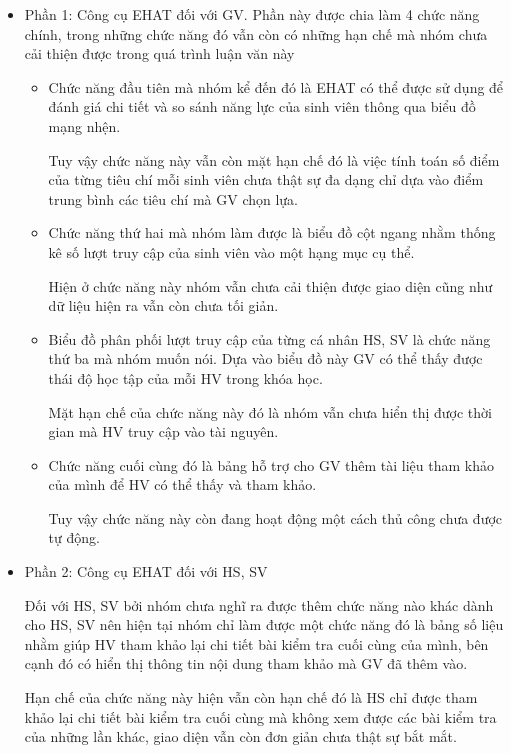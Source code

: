 \begin{itemize}
	\item Phần 1: Công cụ EHAT đối với GV.
	Phần này được chia làm 4 chức năng chính, trong những chức năng đó vẫn còn có những hạn chế mà nhóm chưa cải thiện được trong quá trình luận văn này
	\begin{itemize}
		\item Chức năng đầu tiên mà nhóm kể đến đó là EHAT có thể được sử dụng để đánh giá chi tiết và so sánh năng lực của sinh viên thông qua biểu đồ mạng nhện. 
		
		Tuy vậy chức năng này vẫn còn mặt hạn chế đó là việc tính toán số điểm của từng tiêu chí mỗi sinh viên chưa thật sự đa dạng chỉ dựa vào điểm trung bình các tiêu chí mà GV chọn lựa.
		
		\item Chức năng thứ hai mà nhóm làm được là biểu đồ cột ngang nhằm thống kê số lượt truy cập của sinh viên vào một hạng mục cụ thể. 
		
		Hiện ở chức năng này nhóm vẫn chưa cải thiện được giao diện cũng như dữ liệu hiện ra vẫn còn chưa tối giản.
		
		\item Biểu đồ phân phối lượt truy cập của từng cá nhân HS, SV là chức năng thứ ba mà nhóm muốn nói. Dựa vào biểu đồ này GV có thể thấy được thái độ học tập của mỗi HV trong khóa học. 
		
		Mặt hạn chế của chức năng này đó là nhóm vẫn chưa hiển thị được thời gian mà HV truy cập vào tài nguyên.
		
		\item Chức năng cuối cùng đó là bảng hỗ trợ cho GV thêm tài liệu tham khảo của mình để HV có thể thấy và tham khảo. 
		
		Tuy vậy chức năng này còn đang hoạt động một cách thủ công chưa được tự động.
	\end{itemize}
	\item Phần 2: Công cụ EHAT đối với HS, SV
	
	Đối với HS, SV bởi nhóm chưa nghĩ ra được thêm chức năng nào khác dành cho HS, SV nên hiện tại nhóm chỉ làm được một chức năng đó là bảng số liệu nhằm giúp HV tham khảo lại chi tiết bài kiểm tra cuối cùng của mình, bên cạnh đó có hiển thị thông tin nội dung tham khảo mà GV đã thêm vào.
	
	Hạn chế của chức năng này hiện vẫn còn hạn chế đó là HS chỉ được tham khảo lại chi tiết bài kiểm tra cuối cùng mà không xem được các bài kiểm tra của những lần khác, giao diện vẫn còn đơn giản chưa thật sự bắt mắt.
\end{itemize}

